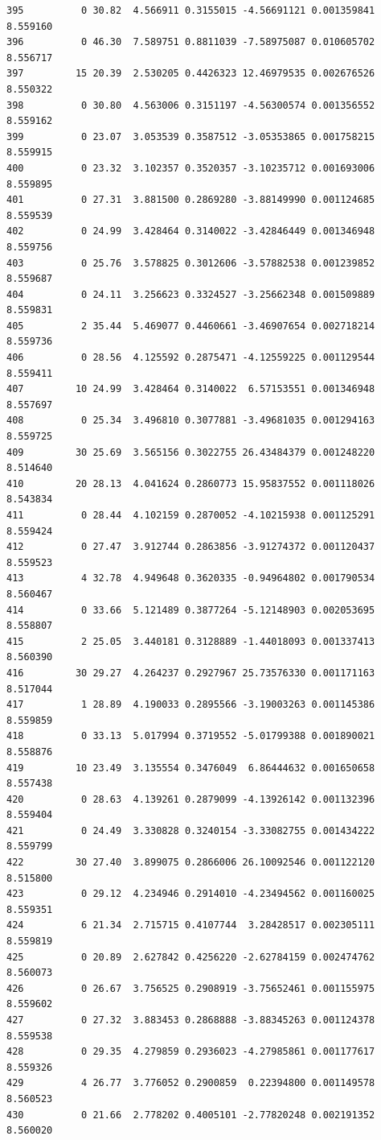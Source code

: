 \documentclass[]{book}
\theoremstyle{definition}
\theoremstyle{definition}
\theoremstyle{definition}
\theoremstyle{remark}
\begin{document}
\begin{verbatim}
395          0 30.82  4.566911 0.3155015 -4.56691121 0.001359841 8.559160
396          0 46.30  7.589751 0.8811039 -7.58975087 0.010605702 8.556717
397         15 20.39  2.530205 0.4426323 12.46979535 0.002676526 8.550322
398          0 30.80  4.563006 0.3151197 -4.56300574 0.001356552 8.559162
399          0 23.07  3.053539 0.3587512 -3.05353865 0.001758215 8.559915
400          0 23.32  3.102357 0.3520357 -3.10235712 0.001693006 8.559895
401          0 27.31  3.881500 0.2869280 -3.88149990 0.001124685 8.559539
402          0 24.99  3.428464 0.3140022 -3.42846449 0.001346948 8.559756
403          0 25.76  3.578825 0.3012606 -3.57882538 0.001239852 8.559687
404          0 24.11  3.256623 0.3324527 -3.25662348 0.001509889 8.559831
405          2 35.44  5.469077 0.4460661 -3.46907654 0.002718214 8.559736
406          0 28.56  4.125592 0.2875471 -4.12559225 0.001129544 8.559411
407         10 24.99  3.428464 0.3140022  6.57153551 0.001346948 8.557697
408          0 25.34  3.496810 0.3077881 -3.49681035 0.001294163 8.559725
409         30 25.69  3.565156 0.3022755 26.43484379 0.001248220 8.514640
410         20 28.13  4.041624 0.2860773 15.95837552 0.001118026 8.543834
411          0 28.44  4.102159 0.2870052 -4.10215938 0.001125291 8.559424
412          0 27.47  3.912744 0.2863856 -3.91274372 0.001120437 8.559523
413          4 32.78  4.949648 0.3620335 -0.94964802 0.001790534 8.560467
414          0 33.66  5.121489 0.3877264 -5.12148903 0.002053695 8.558807
415          2 25.05  3.440181 0.3128889 -1.44018093 0.001337413 8.560390
416         30 29.27  4.264237 0.2927967 25.73576330 0.001171163 8.517044
417          1 28.89  4.190033 0.2895566 -3.19003263 0.001145386 8.559859
418          0 33.13  5.017994 0.3719552 -5.01799388 0.001890021 8.558876
419         10 23.49  3.135554 0.3476049  6.86444632 0.001650658 8.557438
420          0 28.63  4.139261 0.2879099 -4.13926142 0.001132396 8.559404
421          0 24.49  3.330828 0.3240154 -3.33082755 0.001434222 8.559799
422         30 27.40  3.899075 0.2866006 26.10092546 0.001122120 8.515800
423          0 29.12  4.234946 0.2914010 -4.23494562 0.001160025 8.559351
424          6 21.34  2.715715 0.4107744  3.28428517 0.002305111 8.559819
425          0 20.89  2.627842 0.4256220 -2.62784159 0.002474762 8.560073
426          0 26.67  3.756525 0.2908919 -3.75652461 0.001155975 8.559602
427          0 27.32  3.883453 0.2868888 -3.88345263 0.001124378 8.559538
428          0 29.35  4.279859 0.2936023 -4.27985861 0.001177617 8.559326
429          4 26.77  3.776052 0.2900859  0.22394800 0.001149578 8.560523
430          0 21.66  2.778202 0.4005101 -2.77820248 0.002191352 8.560020

\end{verbatim}
\end{document}
